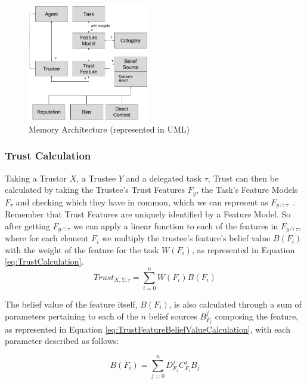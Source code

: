 \begin{figure}[hbt]
    \centering
    \includegraphics[width=200px]{figures/TrustMemoryDiagram.png}
    \caption{Memory Architecture (represented in UML)}
    \label{fig:MemoryArchitecture}
\end{figure}


\subsubsection{Trust Calculation}
Taking a Trustor $X$, a Trustee $Y$ and a delegated task $\tau$, Trust can then be calculated by taking the Trustee's Trust Features $F_y$, the Task's Feature Models $F_\tau$ and checking which they have in common, which we can represent as $F_{y\cap\tau}$~. Remember that Trust Features are uniquely identified by a Feature Model. So after getting $F_{y\cap\tau}$ we can apply a linear function to each of the features in $F_{y\cap\tau}$, where for each element $F_i$ we multiply the trustee's feature's belief value $B(F_i)$ with the weight of the feature for the task $W(F_i)$, as represented in Equation \ref{eq:TrustCalculation}.
\begin{equation}
Trust_{X,Y,\tau}=\sum_{i=0}^{n}W(F_i) B(F_i)
\label{eq:TrustCalculation}
\end{equation}

The belief value of the feature itself, $B(F_i)$, is also calculated through a sum of parameters pertaining to each of the $n$ belief sources $B_{F_i}^j$ composing the feature, as represented in Equation \ref{eq:TrustFeatureBeliefValueCalculation}, with each parameter described as follows: 

\begin{equation}
B(F_i) = \sum_{j=0}^{n} D^j_{F_i} C^j_{F_i} B_j 
\label{eq:TrustFeatureBeliefValueCalculation}
\end{equation}

